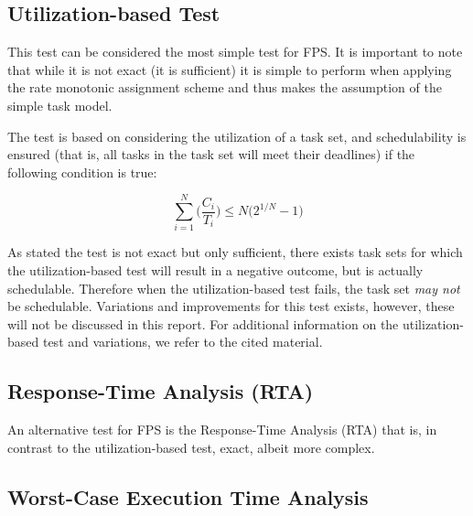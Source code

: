 \subsection{Utilization-based Test} %
\label{sub:utilization_based_test}
This test can be considered the most simple test for FPS. It is important to note that while it is not exact (it is sufficient) it is simple to perform when applying the rate monotonic assignment scheme and thus makes the assumption of the simple task model.

The test is based on considering the utilization of a task set, and schedulability is ensured (that is, all tasks in the task set will meet their deadlines) if the following condition is true:

\begin{equation}
	\sum_{i=1}^N \biggl(\frac{C_i}{T_i}\biggr) \le N\bigl( 2^{1/N} - 1 \bigr)
\end{equation}

As stated the test is not exact but only sufficient, there exists task sets for which the utilization-based test will result in a negative outcome, but is actually schedulable. Therefore when the utilization-based test fails, the task set \textit{may not} be schedulable. Variations and improvements for this test exists, however, these will not be discussed in this report. For additional information on the utilization-based test and variations, we refer to the cited material.


\subsection{Response-Time Analysis (RTA)} %
\label{sub:response_time_analysis_}
An alternative test for FPS is the Response-Time Analysis (RTA) that is, in contrast to the utilization-based test, exact, albeit more complex.



\subsection{Worst-Case Execution Time Analysis} %
\label{sub:worst_case_execution_time_analysis}



